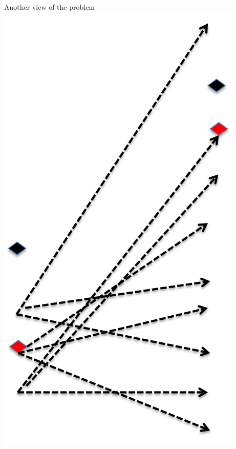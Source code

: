 \documentclass[12pt,a4paper,t,xcolor=dvipsnames,slidestop,compress,mathserif]{beamer}
\begin{document}
\begin{frame}{Another view of the problem}
\includegraphics[scale=0.3]{fwd_sampling_graphic4.png}
\end{frame}
%
%
%
%
%
\end{document}
